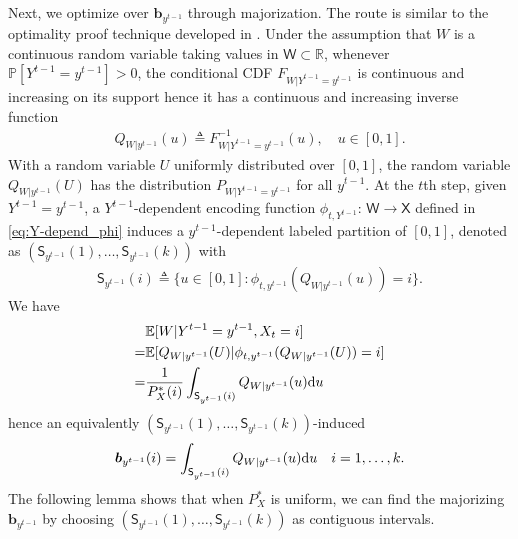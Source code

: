 \documentclass{article}
\newcommand{\R}{\mathbb{R}}
\newcommand{\E}{\mathbb{E}}
\def\sS{{\mathsf S}}
\def\sW{{\mathsf W}}
\def\sX{{\mathsf X}}
\def\rd{{\rm d}}
\def\PP{{\mathbb P}}
\def\deq{\triangleq}
\begin{document}
Next, we optimize over $\boldsymbol{b}_{y^{t-1}}$ through majorization. The route is similar to the optimality proof technique developed in \cite{quantization_xu}. 
Under the assumption that $W$ is a continuous random variable taking values in $\sW\subset\R$, whenever $\PP[Y^{t-1}=y^{t-1}]>0$, the conditional CDF $F_{W|Y^{t-1}=y^{t-1}}$ is continuous and increasing on its support hence it has a continuous and increasing inverse function
\begin{align}
Q_{W|y^{t-1}}(u) \deq F_{W|Y^{t-1}=y^{t-1}}^{-1}(u), \quad u\in[0,1] .
\end{align}
With a random variable $U$ uniformly distributed over $[0,1]$, the random variable $Q_{W|y^{t-1}}(U)$ has the distribution $P_{W|Y^{t-1}=y^{t-1}}$ for all $y^{t-1}$. 
At the $t$th step, given $Y^{t-1}=y^{t-1}$, a $Y^{t-1}$-dependent encoding function $\phi_{t,Y^{t-1}}:\,\sW \rightarrow \sX$ defined in \eqref{eq:Y-depend_phi} induces a $y^{t-1}$-dependent labeled partition of $[0,1]$, denoted as $(\sS_{y^{t-1}}(1), \ldots, \sS_{y^{t-1}}(k))$ with
\begin{align}
\sS_{y^{t-1}}(i) \deq \{u\in[0,1]: \phi_{t,y^{t-1}}(Q_{W|y^{t-1}}(u))=i\} .
\end{align}
We have
\begin{align}
& \E[W|Y^{t-1} = y^{t-1}, X_t = i] \nonumber \\
= & \E[Q_{W|y^{t-1}}(U)|\phi_{t,y^{t-1}}(Q_{W|y^{t-1}}(U)) = i] \\
=& \frac{1}{P_X^*(i)} \int_{\sS_{y^{t-1}}(i)} Q_{W|y^{t-1}}(u) \rd u 
\end{align}
hence an equivalently $(\sS_{y^{t-1}}(1), \ldots, \sS_{y^{t-1}}(k))$-induced 
\begin{align}
\boldsymbol{b}_{y^{t-1}}(i) = 
\int_{\sS_{y^{t-1}}(i)} Q_{W|y^{t-1}}(u) \rd u \quad i=1,\ldots,k .
\end{align}
The following lemma shows that when $P_X^*$ is uniform, we can find the majorizing $\boldsymbol{b}_{y^{t-1}}$ by choosing $(\sS_{y^{t-1}}(1), \ldots, \sS_{y^{t-1}}(k))$ as contiguous intervals.
\end{document}
